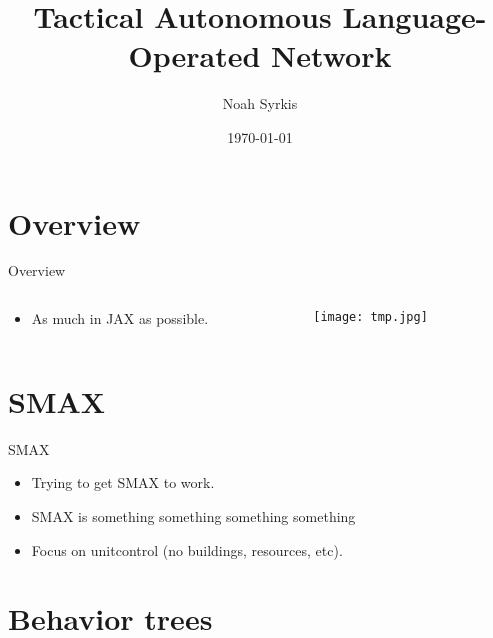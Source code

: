 \documentclass[aspectratio=32]{beamer}
\title{Tactical Autonomous Language-Operated Network}
\date{\mydate\today}
\author{Noah Syrkis}
\providecommand{\tightlist}{\setlength{\itemsep}{0pt}\setlength{\parskip}{0pt}}
\begin{document}
  \ifthenelse{\equal{\inserttitle}{}}{}{%
  \begin{frame}[allowframebreaks]
    \titlepage
  \end{frame}
  }

  \section{\textbar{} Overview}\label{overview}

  \begin{frame}[allowframebreaks]{\textbar{} Overview}
  \begin{columns}[T]
  \begin{column}{0.48\textwidth}
  \begin{itemize}
  \tightlist
  \item
    As much in JAX as possible.
  \end{itemize}
  \end{column}

  \begin{column}{0.48\textwidth}
  \texttt{[image: tmp.jpg]}
  \end{column}
  \end{columns}
  \end{frame}

  \section{\textbar{} SMAX}\label{smax}

  \begin{frame}[allowframebreaks]{\textbar{} SMAX}
  \begin{itemize}
  \tightlist
  \item
    Trying to get SMAX \autocite{rutherford2023} to work.
  \item
    SMAX is something something something something
  \item
    Focus on unitcontrol (no buildings, resources, etc).
  \end{itemize}
  \end{frame}

  \section{\textbar{} Behavior trees}\label{behavior-trees}
\end{document}
